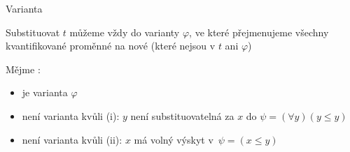 \documentclass{beamer}
\begin{document}
\begin{frame}{Varianta}
    
    Substituovat $t$ můžeme vždy do \alert{varianty} $\varphi$, ve které přejmenujeme všechny kvantifikované proměnné na nové (které nejsou v $t$ ani $\varphi$) \pause 

    \smallskip
    
     \pause 

    \medskip

    Mějme :
    \begin{itemize}
        \item {} je varianta $\varphi$ \pause 
        \item {} není varianta kvůli (i): $y$ není substituovatelná za $x$ do $\psi=(\forall y)(y\leq y)$ \pause 
        \item {} není varianta kvůli (ii): $x$ má volný výskyt v~$\psi=(x\leq y)$        
    \end{itemize}   

\end{frame}
\end{document}
